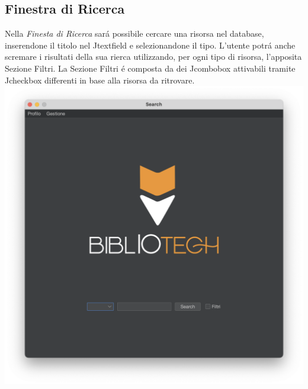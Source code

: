  \subsection{Finestra di Ricerca}
 Nella \textit{Finesta di Ricerca} sar\'a possibile cercare una risorsa nel database, inserendone il titolo nel Jtextfield e 
 selezionandone il tipo. L'utente potr\'a anche scremare i risultati della sua rierca utilizzando, per ogni tipo di risorsa, l'apposita Sezione Filtri.
 La Sezione Filtri \'e composta da dei Jcombobox attivabili tramite Jcheckbox differenti in base alla risorsa da ritrovare.
 \\
 \includegraphics[scale=0.25, center]{Immagini/Schermate/Search/SearchPage.png}

